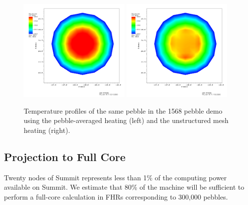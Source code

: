 \begin{figure}[!h]
\centering
\includegraphics[clip=true,width=0.48\textwidth]{Figures/openmc_cell_temperature_zoomed}
\includegraphics[clip=true,width=0.48\textwidth]{Figures/openmc_mesh_temperature_zoomed}
\caption{Temperature profiles of the same pebble in the 1568 pebble demo using
the pebble-averaged heating (left) and the unstructured mesh heating (right).}
\label{f:1568_openmc_temperatures_single_pebble}
\end{figure}

\subsection{Projection to Full Core}

Twenty nodes of Summit represents less than 1\% of the computing power available on Summit. We estimate that 80\% of the machine will be sufficient to perform a full-core calculation in FHRs corresponding to 300,000 pebbles.

